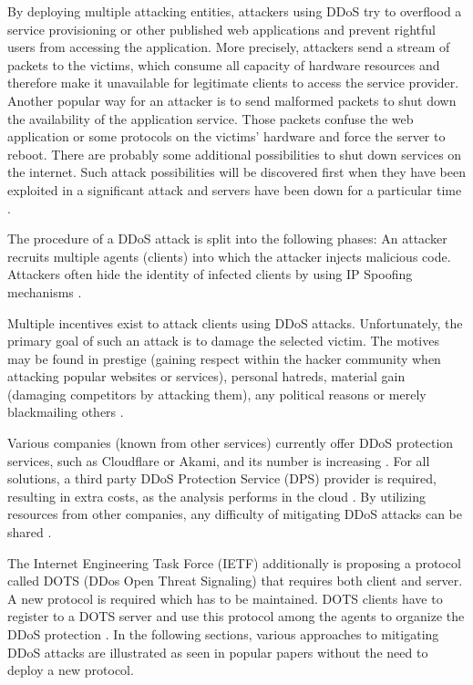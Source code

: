 By deploying multiple attacking entities, attackers using DDoS try to overflood a service provisioning or other published web applications and prevent rightful users from accessing the application. More precisely, attackers send a stream of packets to the victims, which consume all capacity of hardware resources and therefore make it unavailable for legitimate clients to access the service provider. Another popular way for an attacker is to send malformed packets to shut down the availability of the application service. Those packets confuse the web application or some protocols on the victims' hardware and force the server to reboot. There are probably some additional possibilities to shut down services on the internet. Such attack possibilities will be discovered first when they have been exploited in a significant attack and servers have been down for a particular time \cite{Mirkovic2004}.

The procedure of a DDoS attack is split into the following phases: An attacker recruits multiple agents (clients) into which the attacker injects malicious code. Attackers often hide the identity of infected clients by using IP Spoofing mechanisms \cite{Mirkovic2004}.


Multiple incentives exist to attack clients using DDoS attacks. Unfortunately, the primary goal of such an attack is to damage the selected victim. The motives may be found in prestige (gaining respect within the hacker community when attacking popular websites or services), personal hatreds, material gain (damaging competitors by attacking them), any political reasons or merely blackmailing others \cite{Mansfield-Devine2015, Mirkovic2004}.


Various companies (known from other services) currently offer DDoS protection services, such as Cloudflare or Akami, and its number is increasing \cite{Pras2016}. For all solutions, a third party DDoS Protection Service (DPS) provider is required, resulting in extra costs, as the analysis performs in the cloud \cite{Rodrigues2017}. By utilizing resources from other companies, any difficulty of mitigating DDoS attacks can be shared \cite{Rodrigues2017}.

The Internet Engineering Task Force (IETF) additionally is proposing a protocol called DOTS (DDos Open Threat Signaling) that requires both client and server. A new protocol is required which has to be maintained. DOTS clients have to register to a DOTS server and use this protocol among the agents to organize the DDoS protection \cite{Rodrigues2017a}. In the following sections, various approaches to mitigating DDoS attacks are illustrated as seen in popular papers without the need to deploy a new protocol.

